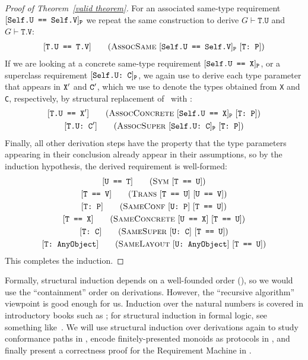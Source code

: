 \documentclass[../generics]{subfiles}
\begin{document}
\begin{proof}[Proof of Theorem~\ref*{valid theorem}]
For an associated same-type requirement $[\texttt{Self.U == Self.V}]_{\texttt{P}}$ we repeat the same construction to derive $G\vdash\texttt{T.U}$ and $G\vdash\texttt{T.V}$:
\begin{gather*}
\AssocSameStepDef
\end{gather*}
If we are looking at a concrete same-type requirement $[\texttt{Self.U == X}]_{\texttt{P}}$, or a superclass requirement $[\texttt{Self.U:~C}]_{\texttt{P}}$, we again use  to derive each type parameter that appears in $\texttt{X}^\prime$ and $\texttt{C}^\prime$, which we use to denote the types obtained from \texttt{X} and \texttt{C}, respectively, by structural replacement of \tSelf\ with \tT:
\begin{gather*}
\AssocConcreteStepDef\\
\AssocSuperStepDef
\end{gather*}
Finally, all other derivation steps have the property that the type parameters appearing in their conclusion already appear in their assumptions, so by the induction hypothesis, the derived requirement is well-formed:
\begin{gather*}
\SymStepDef\\
\TransStepDef\\
\SameConfStepDef\\
\SameConcreteStepDef\\
\SameSuperStepDef\\
\SameLayoutStepDef
\end{gather*}
This completes the induction.
\end{proof}
Formally, structural induction depends on a well-founded order (), so we would use the ``containment'' order on derivations. However, the ``recursive algorithm'' viewpoint is good enough for us. Induction over the natural numbers is covered in introductory books such as \cite{grimaldi}; for structural induction in formal logic, see something like~\cite{bradley2007calculus}. We will use structural induction over derivations again to study conformance paths in , encode finitely-presented monoids as protocols in , and finally present a correctness proof for the Requirement Machine in .

\medskip
\end{document}
